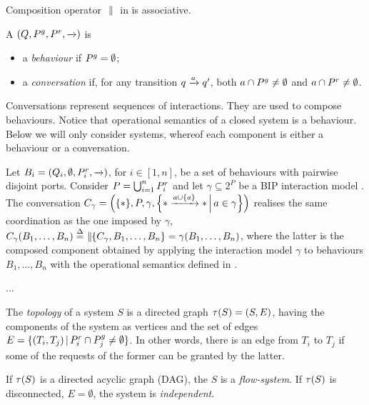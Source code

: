 \begin{proposition}
  \label{prop:associativity}
  Composition operator $\compose$ in  is associative.
\end{proposition}

\begin{definition}
  \label{defn:components}
  A \compmodel{} $(Q, \pin, \pout, \goesto{})$ is
  \begin{itemize}
  \item a \emph{behaviour} if $\pin  = \emptyset$;
  \item a \emph{conversation} if, for any transition $q \goesto{a} q'$, both
    $a \cap \pin \neq \emptyset$ and $a \cap \pout \neq \emptyset$.
  \end{itemize}
\end{definition}

Conversations represent sequences of interactions. They are used to compose
behaviours.  Notice that operational semantics of a closed system is a
behaviour.  Below we will only consider systems, whereof each component is
either a behaviour or a conversation.

\begin{example}
  \label{ex:bip}
  Let $B_i = (Q_i, \emptyset, \pout_i, \goesto{})$, for $i \in [1,n]$, be a
  set of behaviours with pairwise disjoint ports.  Consider $P =
  \bigcup_{i=1}^n \pout_i$ and let $\gamma \subseteq 2^P$ be a BIP
  interaction model \cite{BliSif07-acp-emsoft}.  The conversation $C_\gamma
  = \Big(\{*\}, P, \gamma, \Setdef{* \goesto{a\cup\{a\}} *}{a \in
    \gamma}\Big)$ realises the same coordination as the one imposed by
  $\gamma$, \ie $C_\gamma(B_1, \dots, B_n) \bydef{=} \compose[\{C_\gamma,
    B_1, \dots, B_n\}] = \gamma(B_1, \dots, B_n)$, where the latter is the
  composed component obtained by applying the interaction model $\gamma$ to
  behaviours $B_1, \dots, B_n$ with the operational semantics defined in
  \cite{BliSif07-acp-emsoft}.
\end{example}

\begin{example}
  \label{ex:network}
  ...
\end{example}

\begin{definition}[Topologies]
  \label{defn:topology}
  The \emph{topology} of a system $S$ is a directed graph $\topo{S} = (S,
  E)$, having the components of the system as vertices and the set of edges
  $E = \setdef{(T_i,T_j)}{\pout_i \cap \pin_j \neq \emptyset}$.  In other
  words, there is an edge from $T_i$ to $T_j$ if some of the requests of
  the former can be granted by the latter.

  If $\topo{S}$ is a directed acyclic graph (DAG), the $S$ is a
  \emph{flow-system}.  If $\topo{S}$ is disconnected, \ie $E = \emptyset$,
  the system is \emph{independent}.
\end{definition}

